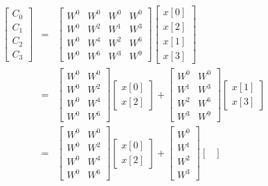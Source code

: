 \begin{eqnarray}
\begin{bmatrix}
C_0 \\
C_1 \\
C_2 \\
C_3
\end{bmatrix}
&=&
\begin{bmatrix}
W^0 & W^0 & W^0 & W^0 \\
W^0 & W^2 & W^1 & W^3 \\
W^0 & W^4 & W^2 & W^6 \\
W^0 & W^6 & W^3 & W^9
\end{bmatrix}
\begin{bmatrix}
x[0] \\
x[2] \\
x[1] \\
x[3]
\end{bmatrix}
\\
&=&
\begin{bmatrix}
W^0 & W^0 \\
W^0 & W^2 \\
W^0 & W^4 \\
W^0 & W^6
\end{bmatrix}
\begin{bmatrix}
x[0] \\
x[2]
\end{bmatrix}
+
\begin{bmatrix}
W^0 & W^0 \\
W^1 & W^3 \\
W^2 & W^6 \\
W^3 & W^9
\end{bmatrix}
\begin{bmatrix}
x[1] \\
x[3]
\end{bmatrix}
\\
&=&
\begin{bmatrix}
W^0 & W^0 \\
W^0 & W^2 \\
W^0 & W^4 \\
W^0 & W^6
\end{bmatrix}
\begin{bmatrix}
x[0] \\
x[2]
\end{bmatrix}
+
\begin{bmatrix}
W^0 \\
W^1 \\
W^2 \\
W^3 
\end{bmatrix}
\begin{bmatrix}

\end{bmatrix}
\end{eqnarray}

